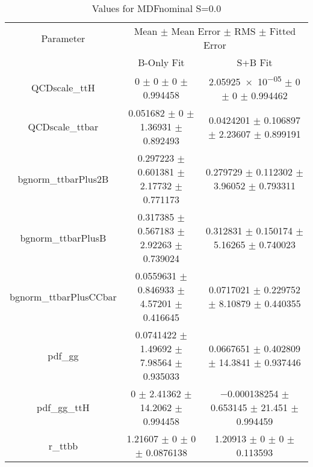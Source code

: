 \begin{table}
\centering
\caption{Values for MDFnominal S=0.0}
\begin{tabular}{ccc}
\toprule
Parameter & \multicolumn{2}{c}{Mean $\pm$ Mean Error $\pm$ RMS $\pm$ Fitted Error}\\
 & B-Only Fit & S+B Fit\\
\midrule
QCDscale\_ttH & \num{0} $\pm$ \num{0} $\pm$ \num{0} $\pm$ \num{0.994458} & \num{2.05925e-05} $\pm$ \num{0} $\pm$ \num{0} $\pm$ \num{0.994462}\\
QCDscale\_ttbar & \num{0.051682} $\pm$ \num{0} $\pm$ \num{1.36931} $\pm$ \num{0.892493} & \num{0.0424201} $\pm$ \num{0.106897} $\pm$ \num{2.23607} $\pm$ \num{0.899191}\\
bgnorm\_ttbarPlus2B & \num{0.297223} $\pm$ \num{0.601381} $\pm$ \num{2.17732} $\pm$ \num{0.771173} & \num{0.279729} $\pm$ \num{0.112302} $\pm$ \num{3.96052} $\pm$ \num{0.793311}\\
bgnorm\_ttbarPlusB & \num{0.317385} $\pm$ \num{0.567183} $\pm$ \num{2.92263} $\pm$ \num{0.739024} & \num{0.312831} $\pm$ \num{0.150174} $\pm$ \num{5.16265} $\pm$ \num{0.740023}\\
bgnorm\_ttbarPlusCCbar & \num{0.0559631} $\pm$ \num{0.846933} $\pm$ \num{4.57201} $\pm$ \num{0.416645} & \num{0.0717021} $\pm$ \num{0.229752} $\pm$ \num{8.10879} $\pm$ \num{0.440355}\\
pdf\_gg & \num{0.0741422} $\pm$ \num{1.49692} $\pm$ \num{7.98564} $\pm$ \num{0.935033} & \num{0.0667651} $\pm$ \num{0.402809} $\pm$ \num{14.3841} $\pm$ \num{0.937446}\\
pdf\_gg\_ttH & \num{0} $\pm$ \num{2.41362} $\pm$ \num{14.2062} $\pm$ \num{0.994458} & \num{-0.000138254} $\pm$ \num{0.653145} $\pm$ \num{21.451} $\pm$ \num{0.994459}\\
r\_ttbb & \num{1.21607} $\pm$ \num{0} $\pm$ \num{0} $\pm$ \num{0.0876138} & \num{1.20913} $\pm$ \num{0} $\pm$ \num{0} $\pm$ \num{0.113593}\\
\bottomrule
\end{tabular}
\end{table}